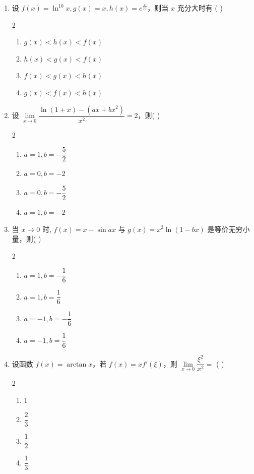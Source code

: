 \begin{enumerate}[label=\textbf{\arabic*.}, itemsep=6cm]
    \item 设 $f(x) = \ln^{10}x, g(x) = x, h(x) = e^{\frac{x}{10}}$，则当 $x$ 充分大时有 ( )
    \begin{multicols}{2}
    \begin{enumerate}
        \item $g(x) < h(x) < f(x)$
        \item $h(x) < g(x) < f(x)$
        \item $f(x) < g(x) < h(x)$
        \item $g(x) < f(x) < h(x)$
    \end{enumerate}
    \end{multicols}
    
    \item 设 $\lim\limits_{x \to 0} \dfrac{\ln(1+x) - (ax + bx^2)}{x^2} = 2$，则( )
    \begin{multicols}{2}
    \begin{enumerate}
        \item $a=1, b=-\dfrac{5}{2}$
        \item $a=0, b=-2$
        \item $a=0, b=-\dfrac{5}{2}$
        \item $a=1, b=-2$
    \end{enumerate}
    \end{multicols}
    
    \item 当 $x \to 0$ 时, $f(x) = x - \sin ax$ 与 $g(x) = x^2\ln(1-bx)$ 是等价无穷小量，则( )
    \begin{multicols}{2}
    \begin{enumerate}
        \item $a=1, b=-\dfrac{1}{6}$
        \item $a=1, b=\dfrac{1}{6}$
        \item $a=-1, b=-\dfrac{1}{6}$
        \item $a=-1, b=\dfrac{1}{6}$
    \end{enumerate}
    \end{multicols}
    
    \item 设函数 $f(x) = \arctan x$，若 $f(x) = x f'(\xi)$，则 $\lim\limits_{x \to 0} \dfrac{\xi^2}{x^2} =$ ( )
    \begin{multicols}{2}
    \begin{enumerate}
        \item $1$
        \item $\dfrac{2}{3}$
        \item $\dfrac{1}{2}$
        \item $\dfrac{1}{3}$
    \end{enumerate}
    \end{multicols}
\end{enumerate}

